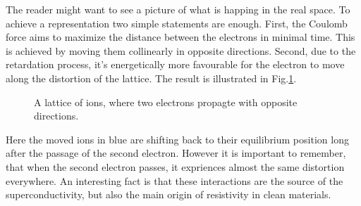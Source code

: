 \documentclass[../main.tex]{subfile}
\begin{document}
The reader might want to see a picture of what is happing in the real space. To achieve a representation two simple statements are enough. 
First, the Coulomb force aims to maximize the distance between the electrons in minimal time.
 This is achieved by moving them collinearly in opposite directions. Second, due to the retardation process, it's energetically more favourable
for the electron to move along the distortion of the lattice. The result is illustrated in Fig.\ref{fig:CooperPairing}. 
\begin{figure}[H]
    
    \centering
    \caption{A lattice of ions, where two electrons propagte with opposite directions.} \label{fig:CooperPairing}
\end{figure}
Here the moved ions in blue are shifting back to their equilibrium position long after the passage of the second electron.
 However it is important to remember, that when the second electron passes, it expriences almost the same distortion everywhere.
An interesting fact is that these interactions are the source of the superconductivity, but also the main origin of resistivity in clean materials.
    
\end{document}

